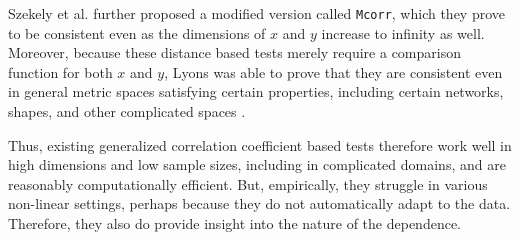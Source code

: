 \documentclass[11pt]{article}
\providecommand{\sct}[1]{{\sc \texttt{#1}}}
\newcommand{\Dcorr}{\sct{Dcorr}}
\newcommand{\Mcorr}{\sct{Mcorr}}
\begin{document}
Szekely et al. \cite{SzekelyRizzo2013a} further proposed a modified version called \Mcorr, which they prove to be consistent even as the dimensions of $x$ and $y$ increase to infinity as well.
Moreover, because these distance based tests merely require a comparison function for both $x$ and $y$, Lyons was able to prove that they are consistent even in general metric spaces satisfying certain properties, including certain networks, shapes, and other complicated spaces  \cite{Lyons2013}.

Thus, existing generalized correlation coefficient based tests therefore work well in high dimensions and low sample sizes, including in complicated domains, and are reasonably computationally efficient. But, empirically, they struggle in various non-linear settings, perhaps because they do not automatically adapt to the data.  Therefore, they also do provide insight into the nature of the dependence.


\end{document}
